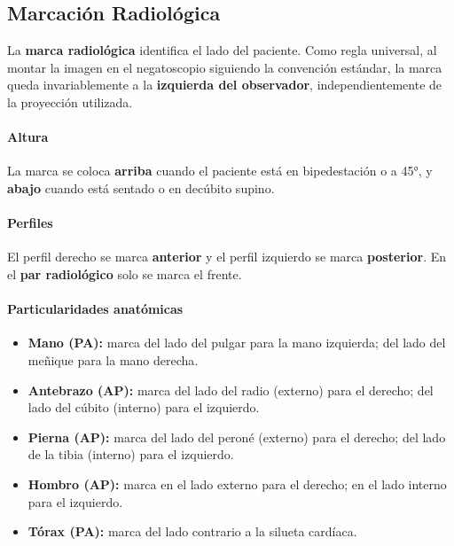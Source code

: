 	\subsection{Marcación Radiológica}
	
	La \textbf{marca radiológica} identifica el lado del paciente. Como regla
	universal, al montar la imagen en el negatoscopio siguiendo la convención estándar,
	la marca queda invariablemente a la \textbf{izquierda del observador},
	independientemente de la proyección utilizada.
	
	\paragraph{Altura}
	La marca se coloca \textbf{arriba} cuando el paciente está en bipedestación o a
	45°, y \textbf{abajo} cuando está sentado o en decúbito supino.
	
	\paragraph{Perfiles}
	El perfil derecho se marca \textbf{anterior} y el perfil izquierdo se marca
	\textbf{posterior}. En el \textbf{par radiológico} solo se marca el frente.
	
	\paragraph{Particularidades anatómicas}
	
	\begin{itemize}
		\item \textbf{Mano (PA):} marca del lado del pulgar para la mano izquierda;
		del lado del meñique para la mano derecha.
		\item \textbf{Antebrazo (AP):} marca del lado del radio (externo) para el
		derecho; del lado del cúbito (interno) para el izquierdo.
		\item \textbf{Pierna (AP):} marca del lado del peroné (externo) para el
		derecho; del lado de la tibia (interno) para el izquierdo.
		\item \textbf{Hombro (AP):} marca en el lado externo para el derecho; en el
		lado interno para el izquierdo.
		\item \textbf{Tórax (PA):} marca del lado contrario a la silueta cardíaca.
	\end{itemize}
	
